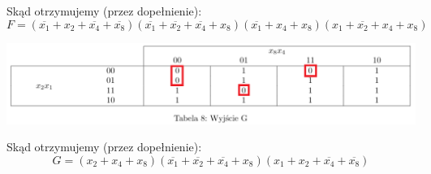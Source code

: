 \documentclass{article}
\begin{document}
            \FloatBarrier
            Skąd otrzymujemy (przez dopełnienie):
            $$F = (\overline{x_1}+x_2+\overline{x_4}+\overline{x_8})(\overline{x_1}+\overline{x_2}+\overline{x_4}+x_8)(\overline{x_1}+x_4+x_8)(x_1+\overline{x_2}+x_4+x_8)$$
            \begin{center}
                \includegraphics[width=18cm]{reports/img/Z1C_tab_8.png}\\
            \end{center}
                        
                         
                        
            \FloatBarrier
            Skąd otrzymujemy (przez dopełnienie):
            $$G = (x_2+x_4+x_8)(\overline{x_1}+\overline{x_2}+\overline{x_4}+x_8)(x_1+x_2+\overline{x_4}+\overline{x_8})$$
            \FloatBarrier
            
\end{document}

